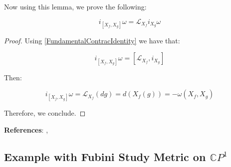 Now using this lemma, we prove the following:

\begin{lemma}
\label{PoissonIsLie}
$$i_{[X_{f}, X_{g}]} \omega = \mathcal{L}_{X_{f}} i_{X_{g}} \omega $$
\end{lemma}

\begin{proof}
Using \ref{FundamentalContracIdentity} we have that:

$$i_{[X_{f}, X_{g}]} \omega = [\mathcal{L}_{X_{f}}, i_{X_{g}}]$$

\noindent Then:

$$i_{[X_{f}, X_{g}]} \omega = \mathcal{L}_{X_{f}}(dg) = d(X_{f}(g)) = -\omega(X_{f}, X_{g})$$

\noindent Therefore, we conclude.
\end{proof}

\noindent \textbf{References}: \textcite{Silva2001}, \textcite{Isham:1999rh}

\subsection{Example with Fubini Study Metric on $\mathbb{C} P^{1}$}

